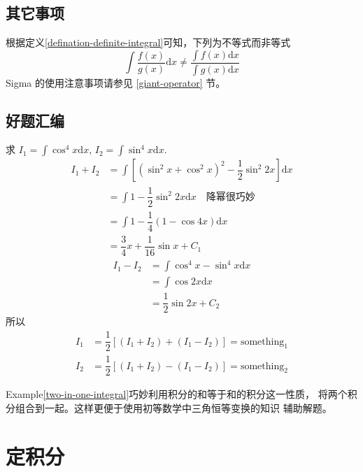 \documentclass{beaulivre}
\begin{document}
\subsection{其它事项}

根据定义\ref{defination-definite-integral}可知，下列为不等式而非等式
\[
    \int \dfrac{f(x)}{g(x)} \mathrm{d}x 
    \neq 
    \dfrac{\int f(x) \mathrm{d} x}{\int g(x) \mathrm{d} x}
\]
Sigma 的使用注意事项请参见 \ref{giant-operator} 节。

\subsection{好题汇编}

\begin{example}\label{two-in-one-integral}
    求 $I_1 = \int \cos ^4 x \mathrm{d} x$, $I_2 = \int \sin ^4 x \mathrm{d} x$.
    \begin{align*}
        I_1 + I_2 &= \int 
                    \left[
                        (\sin ^2 x + \cos ^2 x)^2 - \dfrac{1}{2} \sin ^2 2x
                    \right] \mathrm{d}x \\
                  &= \int 1 - \dfrac{1}{2} \sin ^2 2x \mathrm{d} x \quad \mbox{降幂很巧妙}\\
                  &= \int 1 - \dfrac{1}{4} (1-\cos 4x) \mathrm{d} x \\
                  &= \dfrac{3}{4} x + \dfrac{1}{16} \sin x + C_1
    \end{align*}
    \begin{align*}
        I_1 - I_2 &= \int \cos ^4 x - \sin ^4 x \mathrm{d}x \\
                  &= \int \cos 2x \mathrm{d}x \\
                  &= \dfrac{1}{2} \sin 2x +C_2
    \end{align*}
    所以
    \begin{align*}
        I_1 &= \dfrac{1}{2} \left[(I_1+I_2)+(I_1-I_2)\right]=\mbox{something}_1 \\ 
        I_2 &= \dfrac{1}{2} \left[(I_1+I_2)-(I_1-I_2)\right]=\mbox{something}_2
    \end{align*}
    \cite[page 26, question 57]{w660ans}
\end{example}
Example\ref{two-in-one-integral}巧妙利用积分的和等于和的积分这一性质，
将两个积分组合到一起。这样更便于使用初等数学中三角恒等变换的知识
辅助解题。

\section{定积分}\label{finite-integral}
\end{document}
